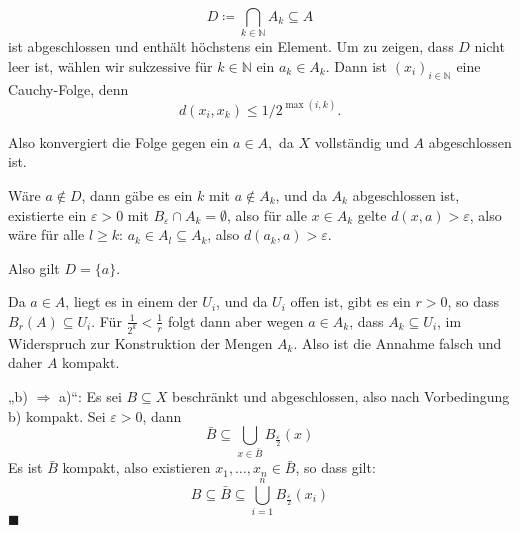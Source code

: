 \documentclass[12pt]{scrbook}   %
\newcommand{\qed}{\phantom{.}\hfill{$\blacksquare$}}
\newcommand{\da}{\coloneqq}
\begin{document}
$$D \da \bigcap_{k\in \mathbb N} A_k \subseteq A$$ ist abgeschlossen und enthält höchstens ein Element. Um zu zeigen, dass $D$ nicht leer ist, wählen wir sukzessive für $k\in \mathbb N$ ein  $a_k \in A_k$. Dann ist $(x_i)_{i\in \mathbb N}$ eine Cauchy-Folge, denn 
$$d(x_i,x_k) \leq 1/2^{\max (i,k)}.$$

Also konvergiert die Folge gegen ein $a\in A,$ da $X$ vollständig und $A$
abgeschlossen ist.

Wäre $a\notin D$, dann gäbe es ein $k$ mit $a\notin A_k$, und da $A_k$ abgeschlossen ist, existierte ein $\varepsilon >0$ mit $B_\varepsilon\cap A_k =\emptyset$, also für alle $x\in A_k$ gelte $d(x,a) > \varepsilon$, also wäre für alle $l\ge k$: $a_k \in A_l \subseteq A_k$, also $d(a_k, a) > \varepsilon$.

Also gilt $D=\{a\}$.

Da $a\in A$, liegt es in einem der $U_i$, und da $U_i$ offen ist, gibt es ein $r>0$, so dass $B_r(A)\subseteq U_i$. Für $\frac1{2^k}<\frac 1r$ folgt dann aber wegen $a\in A_k$, dass $A_k \subseteq U_i$, im Widerspruch zur Konstruktion der Mengen $A_k$. Also ist die Annahme falsch und daher $A$ kompakt.

„b) $\Longrightarrow$ a)“: Es sei $B\subseteq X$ beschränkt und abgeschlossen, also nach Vorbedingung b) kompakt. Sei $\varepsilon > 0$, dann $$\bar B \subseteq \bigcup_{x\in\bar B} B_{\frac \varepsilon2}(x)$$
Es ist $\bar B$ kompakt, also existieren $x_1,\ldots,x_n \in \bar B$, so dass gilt:
$$ B\subseteq \bar B \subseteq  \bigcup_{i=1}^n B_{\frac \varepsilon2}(x_i)$$
\qed
\end{document}
